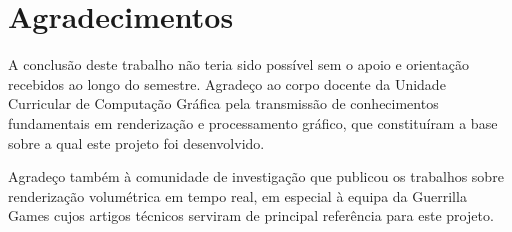 \chapter*{Agradecimentos}
\label{chap:ack}

A conclusão deste trabalho não teria sido possível sem o apoio e orientação recebidos ao longo do semestre. Agradeço ao corpo docente da Unidade Curricular de Computação Gráfica pela transmissão de conhecimentos fundamentais em renderização e processamento gráfico, que constituíram a base sobre a qual este projeto foi desenvolvido.

Agradeço também à comunidade de investigação que publicou os trabalhos sobre renderização volumétrica em tempo real, em especial à equipa da Guerrilla Games cujos artigos técnicos serviram de principal referência para este projeto.
